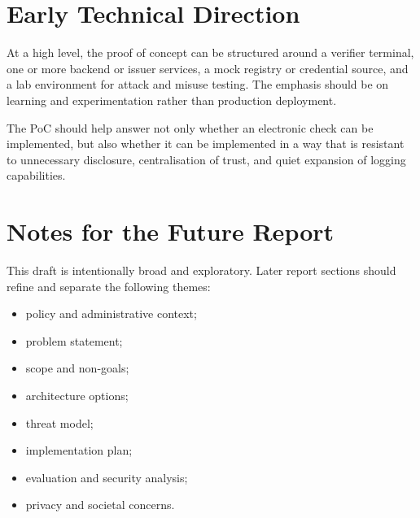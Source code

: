 \documentclass[11pt,a4paper]{article}
\begin{document}
\section{Early Technical Direction}

At a high level, the proof of concept can be structured around a verifier terminal, one or more backend or issuer services, a mock registry or credential source, and a lab environment for attack and misuse testing. The emphasis should be on learning and experimentation rather than production deployment.

The PoC should help answer not only whether an electronic check can be implemented, but also whether it can be implemented in a way that is resistant to unnecessary disclosure, centralisation of trust, and quiet expansion of logging capabilities.

\section{Notes for the Future Report}

This draft is intentionally broad and exploratory. Later report sections should refine and separate the following themes:

\begin{itemize}
    \item policy and administrative context;
    \item problem statement;
    \item scope and non-goals;
    \item architecture options;
    \item threat model;
    \item implementation plan;
    \item evaluation and security analysis;
    \item privacy and societal concerns.
\end{itemize}
\end{document}
